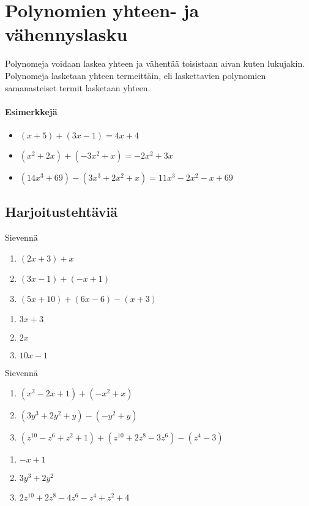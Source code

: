 \chapter{Polynomien yhteen- ja vähennyslasku}

Polynomeja voidaan laskea yhteen ja vähentää toisistaan aivan kuten lukujakin. Polynomeja lasketaan yhteen termeittäin, eli laskettavien polynomien samanasteiset termit lasketaan yhteen.

\subsubsection*{Esimerkkejä}
\begin{itemize}
    \item $(x+5) + (3x-1) = 4x + 4$
    \item $(x^2 + 2x) + (-3x^2 + x) = -2x^2 + 3x$
    \item $(14x^3 + 69) - (3x^3 + 2x^2 + x) = 11x^3 - 2x^2 - x +69$
\end{itemize}

\section{Harjoitustehtäviä}

\begin{tehtava}
    Sievennä
    \begin{enumerate}
        \item $(2x + 3) + x $
        \item $(3x - 1) + (-x + 1)$
        \item $(5x + 10) + (6x - 6) - (x + 3)$
    \end{enumerate}
    \begin{vastaus}
        \begin{enumerate}
            \item $3x + 3$
            \item $2x$
            \item $10x - 1$
        \end{enumerate}
    \end{vastaus}
\end{tehtava}

\begin{tehtava}
    Sievennä
    \begin{enumerate}
        \item $(x^2 - 2x + 1) + (-x^2 + x) $
        \item $(3y^3 + 2y^2  + y) - (-y^2 + y)$
        \item $(z^10 - z^6 + z^2 + 1) + (z^10 + 2z^8 - 3z^6) - (z^4 - 3)$
    \end{enumerate}
    \begin{vastaus}
        \begin{enumerate}
            \item $-x + 1$
            \item $3y^3 + 2y^2$
            \item $2z^10 + 2z^8 - 4z^6 - z^4 + z^2 + 4$
        \end{enumerate}
    \end{vastaus}
\end{tehtava}
